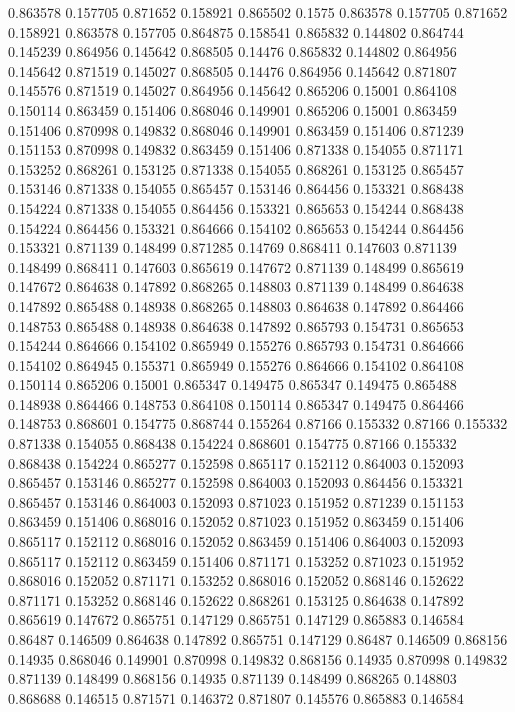 0.863578 0.157705
0.871652 0.158921
0.865502 0.1575
0.863578 0.157705
0.871652 0.158921
0.863578 0.157705
0.864875 0.158541
0.865832 0.144802
0.864744 0.145239
0.864956 0.145642
0.868505 0.14476
0.865832 0.144802
0.864956 0.145642
0.871519 0.145027
0.868505 0.14476
0.864956 0.145642
0.871807 0.145576
0.871519 0.145027
0.864956 0.145642
0.865206 0.15001
0.864108 0.150114
0.863459 0.151406
0.868046 0.149901
0.865206 0.15001
0.863459 0.151406
0.870998 0.149832
0.868046 0.149901
0.863459 0.151406
0.871239 0.151153
0.870998 0.149832
0.863459 0.151406
0.871338 0.154055
0.871171 0.153252
0.868261 0.153125
0.871338 0.154055
0.868261 0.153125
0.865457 0.153146
0.871338 0.154055
0.865457 0.153146
0.864456 0.153321
0.868438 0.154224
0.871338 0.154055
0.864456 0.153321
0.865653 0.154244
0.868438 0.154224
0.864456 0.153321
0.864666 0.154102
0.865653 0.154244
0.864456 0.153321
0.871139 0.148499
0.871285 0.14769
0.868411 0.147603
0.871139 0.148499
0.868411 0.147603
0.865619 0.147672
0.871139 0.148499
0.865619 0.147672
0.864638 0.147892
0.868265 0.148803
0.871139 0.148499
0.864638 0.147892
0.865488 0.148938
0.868265 0.148803
0.864638 0.147892
0.864466 0.148753
0.865488 0.148938
0.864638 0.147892
0.865793 0.154731
0.865653 0.154244
0.864666 0.154102
0.865949 0.155276
0.865793 0.154731
0.864666 0.154102
0.864945 0.155371
0.865949 0.155276
0.864666 0.154102
0.864108 0.150114
0.865206 0.15001
0.865347 0.149475
0.865347 0.149475
0.865488 0.148938
0.864466 0.148753
0.864108 0.150114
0.865347 0.149475
0.864466 0.148753
0.868601 0.154775
0.868744 0.155264
0.87166 0.155332
0.87166 0.155332
0.871338 0.154055
0.868438 0.154224
0.868601 0.154775
0.87166 0.155332
0.868438 0.154224
0.865277 0.152598
0.865117 0.152112
0.864003 0.152093
0.865457 0.153146
0.865277 0.152598
0.864003 0.152093
0.864456 0.153321
0.865457 0.153146
0.864003 0.152093
0.871023 0.151952
0.871239 0.151153
0.863459 0.151406
0.868016 0.152052
0.871023 0.151952
0.863459 0.151406
0.865117 0.152112
0.868016 0.152052
0.863459 0.151406
0.864003 0.152093
0.865117 0.152112
0.863459 0.151406
0.871171 0.153252
0.871023 0.151952
0.868016 0.152052
0.871171 0.153252
0.868016 0.152052
0.868146 0.152622
0.871171 0.153252
0.868146 0.152622
0.868261 0.153125
0.864638 0.147892
0.865619 0.147672
0.865751 0.147129
0.865751 0.147129
0.865883 0.146584
0.86487 0.146509
0.864638 0.147892
0.865751 0.147129
0.86487 0.146509
0.868156 0.14935
0.868046 0.149901
0.870998 0.149832
0.868156 0.14935
0.870998 0.149832
0.871139 0.148499
0.868156 0.14935
0.871139 0.148499
0.868265 0.148803
0.868688 0.146515
0.871571 0.146372
0.871807 0.145576
0.865883 0.146584
